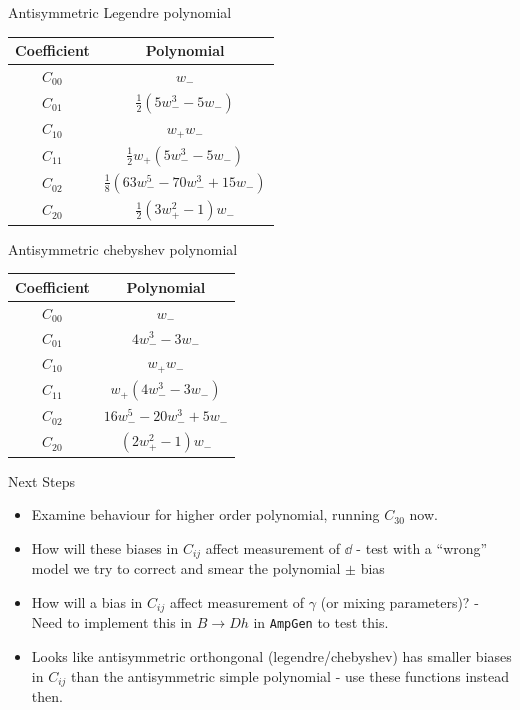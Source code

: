 

\begin{frame}{Antisymmetric Legendre polynomial}
\begin{center}
\begin{tabular}{|c|c|}
Coefficient & Polynomial \\ \hline

$C_{00}$ & $w_-$ \\
$C_{01}$ & $\frac{1}{2} \left(5 w_-^3 - 5 w_-\right)$ \\
$C_{10}$ & $ w_+ w_-$ \\
$C_{11}$ & $ \frac{1}{2} w_+  \left(5 w_-^3 - 5 w_-\right)$\\
$C_{02}$ & $\frac{1}{8}\left(63 w_-^5 - 70 w_-^3 + 15 w_-\right)$ \\
$C_{20}$ & $\frac{1}{2} \left(3 w_+^2 - 1\right) w_-$

\end{tabular}
\end{center}
\end{frame}


\begin{frame}{Antisymmetric chebyshev polynomial}
\begin{center}
\begin{tabular}{|c|c|}
Coefficient & Polynomial \\ \hline

$C_{00}$ & $w_-$ \\
$C_{01}$ & $4 w_-^3 - 3 w_-$ \\
$C_{10}$ & $ w_+ w_-$ \\
$C_{11}$ & $ w_+ \left(4 w_-^3 - 3 w_-\right)$\\
$C_{02}$ & $16 w_-^5 - 20 w_-^3 + 5 w_-$ \\
$C_{20}$ & $\left(2 w_+^2 - 1\right) w_-$

\end{tabular}
\end{center}
\end{frame}


\begin{frame}{Next Steps}
\begin{itemize}
\item Examine behaviour for higher order polynomial, running $C_{30}$ now.
\item How will these biases in $C_{ij}$ affect measurement of $\dd$ - test with a ``wrong'' model we try to correct and smear the polynomial $\pm$ bias
\item How will a bias in $C_{ij}$ affect measurement of $\gamma$ (or mixing parameters)? - Need to implement this in $B \to Dh$ in \texttt{AmpGen} to test this.
\item Looks like antisymmetric orthongonal (legendre/chebyshev) has smaller biases in $C_{ij}$ than the antisymmetric simple polynomial - use these functions instead then.
\end{itemize}
\end{frame}





